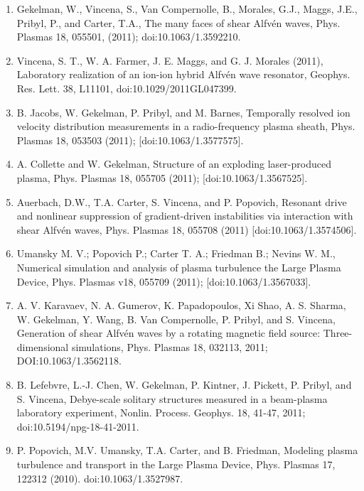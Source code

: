 \documentclass[11pt]{article}
\begin{document}
\begin{enumerate}
\item  Gekelman, W., Vincena, S., Van Compernolle, B., Morales, G.J., Maggs, J.E., Pribyl, P., and Carter, T.A., The many faces of shear Alfv\'{e}n waves, Phys. Plasmas 18, 055501, (2011); doi:10.1063/1.3592210.

\item   Vincena, S. T., W. A. Farmer, J. E. Maggs, and G. J. Morales (2011), Laboratory realization of an ion-ion hybrid Alfv\'{e}n wave resonator, Geophys. Res. Lett. 38, L11101, doi:10.1029/2011GL047399.

\item  B. Jacobs, W. Gekelman, P. Pribyl, and M. Barnes, Temporally resolved ion velocity distribution measurements in a radio-frequency plasma sheath, Phys. Plasmas 18, 053503 (2011); [doi:10.1063/1.3577575].

\item  A. Collette and W. Gekelman, Structure of an exploding laser-produced plasma, Phys. Plasmas 18, 055705 (2011); [doi:10.1063/1.3567525].

\item   Auerbach, D.W., T.A. Carter, S. Vincena, and P. Popovich, Resonant drive and nonlinear suppression of gradient-driven instabilities via interaction with shear Alfv\'{e}n waves, Phys. Plasmas 18, 055708 (2011) [doi:10.1063/1.3574506].

\item Umansky M. V.; Popovich P.; Carter T. A.; Friedman B.; Nevins W. M., Numerical simulation and analysis of plasma turbulence the Large Plasma Device, Phys. Plasmas v18, 055709 (2011); [doi:10.1063/1.3567033].

\item  A. V. Karavaev, N. A. Gumerov, K. Papadopoulos, Xi Shao, A. S. Sharma, W. Gekelman, Y. Wang, B. Van Compernolle, P. Pribyl, and S. Vincena, Generation of shear Alfv\'{e}n waves by a rotating magnetic field source: Three-dimensional simulations, Phys. Plasmas 18, 032113, 2011; DOI:10.1063/1.3562118.

\item  B. Lefebvre, L.-J. Chen, W. Gekelman, P. Kintner, J. Pickett, P. Pribyl, and S. Vincena, Debye-scale solitary structures measured in a beam-plasma laboratory experiment, Nonlin. Process. Geophys. 18, 41-47, 2011; doi:10.5194/npg-18-41-2011.

\item   P. Popovich, M.V. Umansky, T.A. Carter, and B. Friedman, Modeling plasma turbulence and transport in the Large Plasma Device, Phys. Plasmas 17, 122312  (2010). doi:10.1063/1.3527987.


\end{enumerate}
\end{document}
